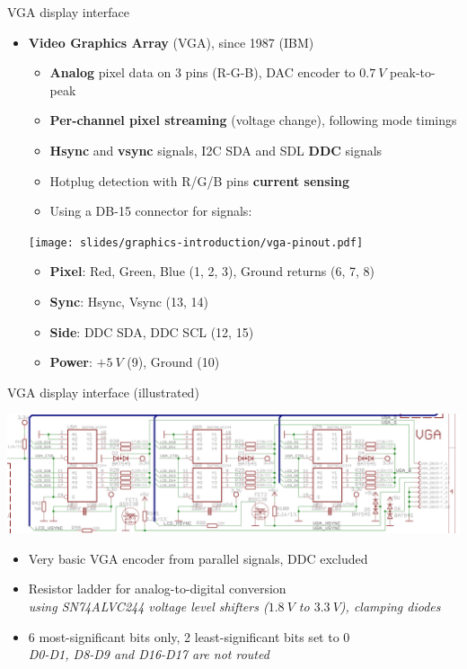 \begin{frame}{VGA display interface}
  \begin{itemize}
  \item \textbf{Video Graphics Array} (VGA), since 1987 (IBM)
    \begin{itemize}
    \item \textbf{Analog} pixel data on 3 pins (R-G-B), DAC encoder to \(0.7~V\) peak-to-peak
    \item \textbf{Per-channel pixel streaming} (voltage change), following mode timings
    \item \textbf{Hsync} and \textbf{vsync} signals, I2C SDA and SDL \textbf{DDC} signals
    \item Hotplug detection with R/G/B pins \textbf{current sensing}
    \item Using a DB-15 connector for signals:
    \end{itemize}
  \begin{center}
    \texttt{[image: slides/graphics-introduction/vga-pinout.pdf]}
  \end{center}
  \begin{itemize}
  \item \textbf{Pixel}: Red, Green, Blue {\footnotesize(1, 2, 3)}, Ground returns {\footnotesize(6, 7, 8)}
  \item \textbf{Sync}: Hsync, Vsync {\footnotesize(13, 14)}
  \item \textbf{Side}: DDC SDA, DDC SCL {\footnotesize(12, 15)}
  \item \textbf{Power}: \(+5~V\) {\footnotesize(9)}, Ground {\footnotesize(10)}
  \end{itemize}
  \end{itemize}

\end{frame}

\begin{frame}{VGA display interface (illustrated)}
  \begin{center}
    \includegraphics[width=\textwidth]{slides/graphics-introduction/a13-olinuxino-vga.png}
  \end{center}

  \begin{itemize}
  \item Very basic VGA encoder from parallel signals, DDC excluded
  \item Resistor ladder for analog-to-digital conversion\\
  \textit{using SN74ALVC244 voltage level shifters (\(1.8~V\) to \(3.3~V\)), clamping diodes}
  \item 6 most-significant bits only, 2 least-significant bits set to 0\\
  \textit{D0-D1, D8-D9 and D16-D17 are not routed}
  \end{itemize}
\end{frame}

